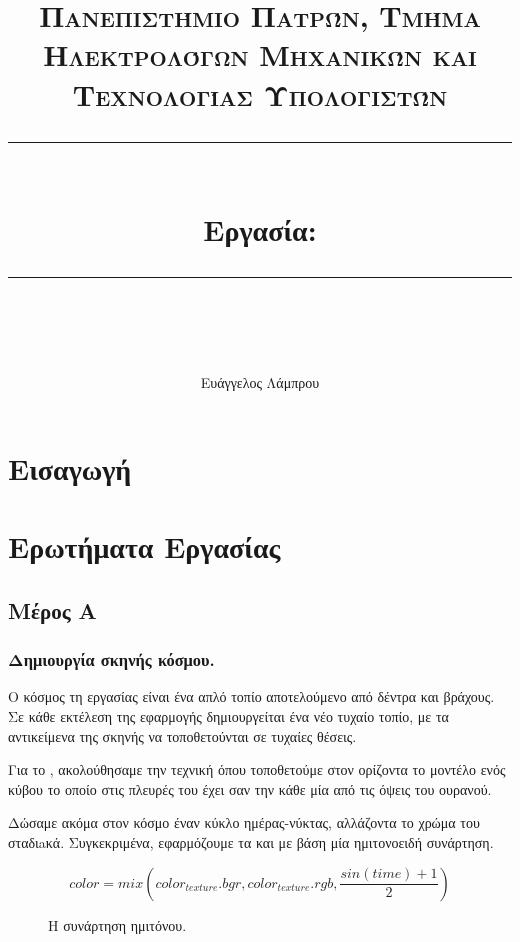 \documentclass[11pt]{scrartcl} %
\title{	
	\normalfont\normalsize
	\textsc{Πανεπιστήμιο Πατρών, Τμήμα Ηλεκτρολόγων Μηχανικών και Τεχνολογίας Υπολογιστών}\\ %
	\vspace{25pt} %
	\rule{\linewidth}{0.5pt}\\ %
	\vspace{20pt} %
	{\Large Εργασία: \en{Pokemon}}\\ %
	\vspace{12pt} %
	\rule{\linewidth}{2pt}\\ %
	\vspace{12pt} %
}
\author{\LARGE Ευάγγελος Λάμπρου \\ \en{UP1066519}} %
\date{} %
\begin{document}
\maketitle 

\tableofcontents

\newpage

\section{Εισαγωγή}

\section{Ερωτήματα Εργασίας}

\subsection{Μέρος Α}

\subsubsection{Δημιουργία σκηνής κόσμου.}

Ο κόσμος τη εργασίας είναι ένα απλό τοπίο αποτελούμενο από δέντρα και βράχους. Σε κάθε εκτέλεση της εφαρμογής
δημιουργείται ένα νέο τυχαίο τοπίο, με τα αντικείμενα της σκηνής να τοποθετούνται σε τυχαίες θέσεις. 

Για το , ακολούθησαμε την τεχνική όπου τοποθετούμε στον ορίζοντα το μοντέλο ενός κύβου το οποίο 
στις πλευρές του έχει σαν  την κάθε μία από τις όψεις του ουρανού.


Δώσαμε ακόμα στον κόσμο έναν κύκλο ημέρας-νύκτας, αλλάζοντα το χρώμα του  σταδιaκά. Συγκεκριμένα, 
εφαρμόζουμε   τα  και   με βάση μία ημιτονοειδή συνάρτηση.


\begin{equation}
    color = mix(color_{texture}.bgr, color_{texture}.rgb, \frac{sin(time) + 1}{2})
\end{equation}

\begin{figure}[H]
    \begin{center}
        \caption{Η συνάρτηση ημιτόνου.}
        \end{center}
\end{figure}
\end{document}
